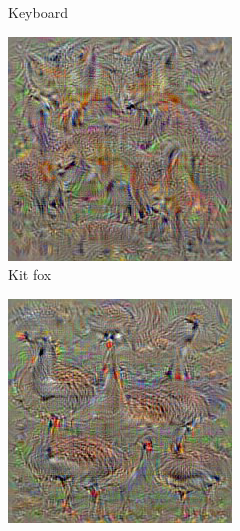 \begin{figure}[t]
\begin{subfigure}[b]{0.3\textwidth}
    \caption{Keyboard}
    \label{fig:sec:context:deep-visualization-class-4}
  \end{subfigure}
  \hfill
  \begin{subfigure}[b]{0.3\textwidth}
    \includegraphics[width=\textwidth]{gfx/deep-visualization-class-5}
    \caption{Kit fox}
    \label{fig:sec:context:deep-visualization-class-5}
  \end{subfigure}
  \hfill
  \begin{subfigure}[b]{0.3\textwidth}
    \includegraphics[width=\textwidth]{gfx/deep-visualization-class-6}

\end{subfigure}
\end{figure}
